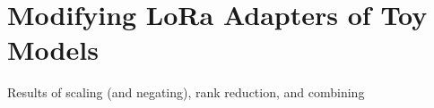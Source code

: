 \section{Modifying LoRa Adapters of Toy Models}\label{sec:appendix-a}

Results of scaling (and negating), rank reduction, and combining

